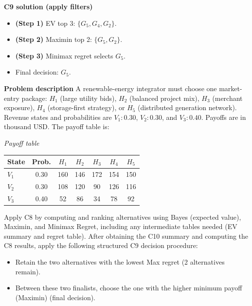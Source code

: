 \begin{ExamProblems}
		\textbf{C9 solution (apply filters)}\par
		\begin{itemize}
			\item \textbf{(Step 1)} EV top 3: $\{G_5,G_4,G_2\}$.
			\item \textbf{(Step 2)} Maximin top 2: $\{G_5,G_2\}$.
			\item \textbf{(Step 3)} Minimax regret selects $G_5$.
			\item Final decision: $G_5$.
		\end{itemize}
		
		\newpage
		\item
		\textbf{Problem description}
		A renewable-energy integrator must choose one market-entry package: $H_1$ (large utility bids), $H_2$ (balanced project mix), $H_3$ (merchant exposure), $H_4$ (storage-first strategy), or $H_5$ (distributed generation network).
		Revenue states and probabilities are $V_1:0.30$, $V_2:0.30$, and $V_3:0.40$. Payoffs are in thousand USD. The payoff table is:
		
		\begin{center}
			\textit{Payoff table} \\
			\begin{tabular}{l c c c c c c}
				\hline
				State& Prob. & $H_1$ & $H_2$ & $H_3$ & $H_4$ & $H_5$ \\
				\hline
				$V_1$ & 0.30 & 160 & 146 & 172 & 154 & 150 \\
				$V_2$ & 0.30 & 108 & 120 & 90 & 126 & 116 \\
				$V_3$ & 0.40 & 52 & 86 & 34 & 78 & 92 \\
				\hline
			\end{tabular}
		\end{center}
		
		Apply C8 by computing and ranking alternatives using Bayes (expected value), Maximin, and Minimax Regret, including any intermediate tables needed (EV summary and regret table).
		After obtaining the C10 summary and computing the C8 results, apply the following structured C9 decision procedure:
		\begin{itemize}
			\item Retain the two alternatives with the lowest Max regret (2 alternatives remain).
			\item Between these two finalists, choose the one with the higher minimum payoff (Maximin) (final decision).
		\end{itemize}
		
		\vspace{0.25cm}
		

\end{ExamProblems}

